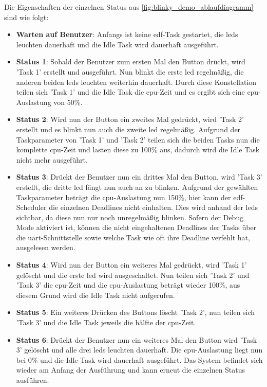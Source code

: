 \documentclass[../EDF Master Thesis.tex]{subfiles}
\begin{document}
    Die Eigenschaften der einzelnen Status aus \autoref{fig:blinky_demo_ablaufdiagramm} sind wie folgt:
    \begin{itemize}
        \item \textbf{Warten auf Benutzer}: Anfangs ist keine \ac{edf}-Task gestartet, die \ac{led}s leuchten dauerhaft und die Idle Task wird dauerhaft ausgeführt.
        \item \textbf{Status 1}: Sobald der Benutzer zum ersten Mal den Button drückt, wird 'Task 1' erstellt und ausgeführt.
            Nun blinkt die erste \ac{led} regelmäßig, die anderen beiden \ac{led}s leuchten weiterhin dauerhaft.
            Durch diese Konstellation teilen sich 'Task 1' und die Idle Task die \ac{cpu}-Zeit und es ergibt sich eine \ac{cpu}-Auslastung von 50\%.
        \item \textbf{Status 2}: Wird nun der Button ein zweites Mal gedrückt, wird 'Task 2' erstellt und es blinkt nun auch die zweite \ac{led} regelmäßig.
            Aufgrund der Taskparameter von 'Task 1' und 'Task 2' teilen sich die beiden Tasks nun die komplette \ac{cpu}-Zeit und lasten diese zu 100\% aus, dadurch wird die Idle Task nicht mehr ausgeführt.
        \item \textbf{Status 3}: Drückt der Benutzer nun ein drittes Mal den Button, wird 'Task 3' erstellt, die dritte \ac{led} fängt nun auch an zu blinken.
            Aufgrund der gewählten Taskparameter beträgt die \ac{cpu}-Auslastung nun 150\%, hier kann der \ac{edf}-Scheduler die einzelnen Deadlines nicht einhalten.
            Dies wird anhand der \ac{led}s sichtbar, da diese nun nur noch unregelmäßig blinken.
            Sofern der Debug Mode aktiviert ist, können die nicht eingehaltenen Deadlines der Tasks über die \ac{uart}-Schnittstelle sowie welche Task wie oft ihre Deadline verfehlt hat, ausgelesen werden.
        \item \textbf{Status 4}: Wird nun der Button ein weiteres Mal gedrückt, wird 'Task 1' gelöscht und die erste \ac{led} wird ausgeschaltet.
            Nun teilen sich 'Task 2' und 'Task 3' die \ac{cpu}-Zeit und die \ac{cpu}-Auslastung beträgt wieder 100\%, aus diesem Grund wird die Idle Task nicht aufgerufen.
        \item \textbf{Status 5}: Ein weiteres Drücken des Buttons löscht 'Task 2', nun teilen sich 'Task 3' und die Idle Task jeweils die hälfte der \ac{cpu}-Zeit.
        \item \textbf{Status 6}: Drückt der Benutzer nun ein weiteres Mal den Button wird 'Task 3' gelöscht und alle drei \ac{led}s leuchten dauerhaft.
            Die \ac{cpu}-Auslastung liegt nun bei 0\% und die Idle Task wird dauerhaft ausgeführt.
            Das System befindet sich wieder am Anfang der Ausführung und kann erneut die einzelnen Status ausführen.
    \end{itemize}
\end{document}
